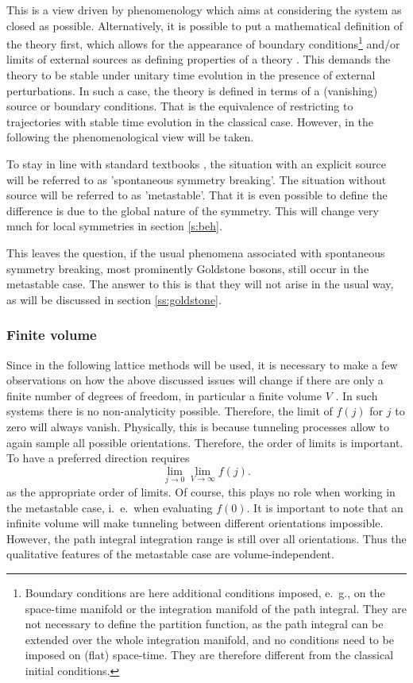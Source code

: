 \documentclass[final,12pt]{article}
\newcommand*{\no}{\noindent}
\newcommand*{\be}{\begin{equation}}
\newcommand*{\ee}{\end{equation}}
\newcommand*{\nn}{\nonumber}
\newcommand*{\1}{1\!\!\!\bot}
\begin{document}
This is a view driven by phenomenology which aims at considering the system as closed as possible. Alternatively, it is possible to put a mathematical definition of the theory first, which allows for the appearance of boundary conditions\footnote{Boundary conditions are here additional conditions imposed, e.\ g., on the space-time manifold or the integration manifold of the path integral. They are not necessary to define the partition function, as the path integral can be extended over the whole integration manifold, and no conditions need to be imposed on (flat) space-time. They are therefore different from the classical initial conditions.} and/or limits of external sources as defining properties of a theory \cite{Strocchi:2005yk,Frohlich:1976it}. This demands the theory to be stable under unitary time evolution in the presence of external perturbations. In such a case, the theory is defined in terms of a (vanishing) source or boundary conditions. That is the equivalence of restricting to trajectories with stable time evolution in the classical case. However, in the following the phenomenological view will be taken.

To stay in line with standard textbooks \cite{Bohm:2001yx,Weinberg:1996kr}, the situation with an explicit source will be referred to as 'spontaneous symmetry breaking'. The situation without source will be referred to as 'metastable'. That it is even possible to define the difference is due to the global nature of the symmetry. This will change very much for local symmetries in section \ref{s:beh}.

This leaves the question, if the usual phenomena associated with spontaneous symmetry breaking, most prominently Goldstone bosons, still occur in the metastable case. The answer to this is that they will not arise in the usual way, as will be discussed in section \ref{ss:goldstone}. 

\subsubsection{Finite volume}

Since in the following lattice methods will be used, it is necessary to make a few observations on how the above discussed issues will change if there are only a finite number of degrees of freedom, in particular a finite volume $V$ \cite{Landau:2005mc,Perez:2008fv,Birman:2013gaa}. In such systems there is no non-analyticity possible. Therefore, the limit of $f(j)$ for $j$ to zero will always vanish. Physically, this is because tunneling processes allow to again sample all possible orientations. Therefore, the order of limits is important. To have a preferred direction requires
\be
\lim_{j\to 0}\lim_{V\to\infty}f(j)\nn.
\ee
\no as the appropriate order of limits. Of course, this plays no role when working in the metastable case, i.\ e.\ when evaluating $f(0)$. It is important to note that an infinite volume will make tunneling between different orientations impossible. However, the path integral integration range is still over all orientations. Thus the qualitative features of the metastable case are volume-independent.
\end{document}
